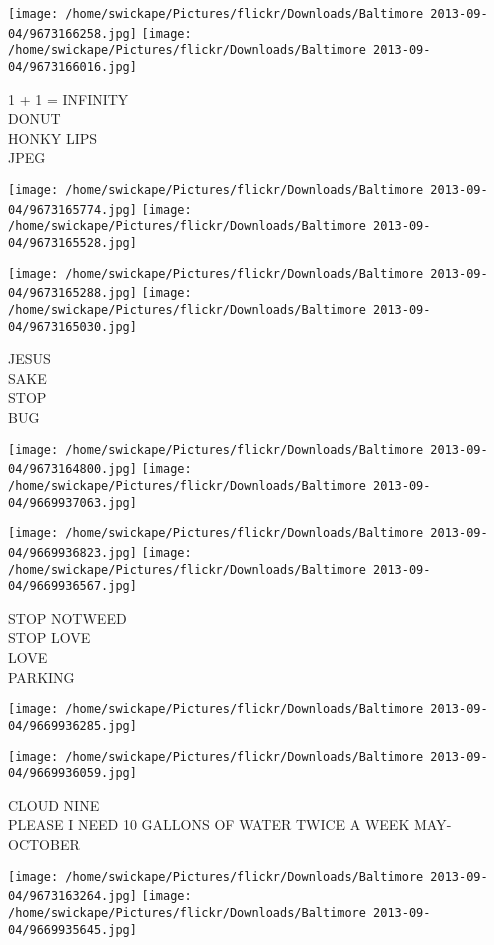 \documentclass[10pt,letterpaper]{article}
\begin{document}
\texttt{[image: /home/swickape/Pictures/flickr/Downloads/Baltimore 2013-09-04/9673166258.jpg]}
\texttt{[image: /home/swickape/Pictures/flickr/Downloads/Baltimore 2013-09-04/9673166016.jpg]}

1 + 1 = INFINITY\\
DONUT\\
HONKY LIPS\\
JPEG
\pagebreak

\texttt{[image: /home/swickape/Pictures/flickr/Downloads/Baltimore 2013-09-04/9673165774.jpg]}
\texttt{[image: /home/swickape/Pictures/flickr/Downloads/Baltimore 2013-09-04/9673165528.jpg]}

\texttt{[image: /home/swickape/Pictures/flickr/Downloads/Baltimore 2013-09-04/9673165288.jpg]}
\texttt{[image: /home/swickape/Pictures/flickr/Downloads/Baltimore 2013-09-04/9673165030.jpg]}

JESUS\\
SAKE\\
STOP\\
BUG
\pagebreak

\texttt{[image: /home/swickape/Pictures/flickr/Downloads/Baltimore 2013-09-04/9673164800.jpg]}
\texttt{[image: /home/swickape/Pictures/flickr/Downloads/Baltimore 2013-09-04/9669937063.jpg]}

\texttt{[image: /home/swickape/Pictures/flickr/Downloads/Baltimore 2013-09-04/9669936823.jpg]}
\texttt{[image: /home/swickape/Pictures/flickr/Downloads/Baltimore 2013-09-04/9669936567.jpg]}

STOP NOTWEED\\
STOP LOVE\\
LOVE\\
PARKING
\pagebreak

\texttt{[image: /home/swickape/Pictures/flickr/Downloads/Baltimore 2013-09-04/9669936285.jpg]}

\vspace{0.25in}
\texttt{[image: /home/swickape/Pictures/flickr/Downloads/Baltimore 2013-09-04/9669936059.jpg]}

CLOUD NINE\\
PLEASE I NEED 10 GALLONS OF WATER TWICE A WEEK MAY{-}OCTOBER
\pagebreak

\texttt{[image: /home/swickape/Pictures/flickr/Downloads/Baltimore 2013-09-04/9673163264.jpg]}
\texttt{[image: /home/swickape/Pictures/flickr/Downloads/Baltimore 2013-09-04/9669935645.jpg]}
\end{document}
